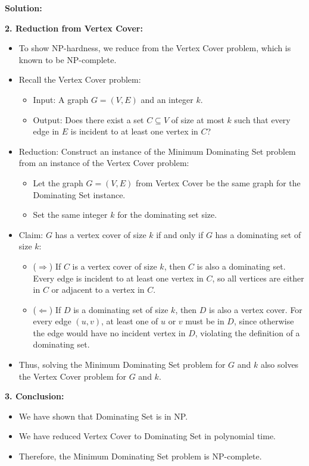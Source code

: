 \documentclass[11pt]{article}
\newenvironment{solution}{%
    \par\noindent\textbf{Solution:}\par%
}{\par}
\begin{document}
\begin{solution}
\textbf{2. Reduction from Vertex Cover:}
\begin{itemize}
    \item To show NP-hardness, we reduce from the Vertex Cover problem, which is known to be NP-complete.
    \item Recall the Vertex Cover problem:
    \begin{itemize}
        \item Input: A graph \( G = (V, E) \) and an integer \( k \).
        \item Output: Does there exist a set \( C \subseteq V \) of size at most \( k \) such that every edge in \( E \) is incident to at least one vertex in \( C \)?
    \end{itemize}
    \item Reduction: Construct an instance of the Minimum Dominating Set problem from an instance of the Vertex Cover problem:
    \begin{itemize}
        \item Let the graph \( G = (V, E) \) from Vertex Cover be the same graph for the Dominating Set instance.
        \item Set the same integer \( k \) for the dominating set size.
    \end{itemize}
    \item Claim: \( G \) has a vertex cover of size \( k \) if and only if \( G \) has a dominating set of size \( k \):
    \begin{itemize}
        \item (\( \Rightarrow \)) If \( C \) is a vertex cover of size \( k \), then \( C \) is also a dominating set. Every edge is incident to at least one vertex in \( C \), so all vertices are either in \( C \) or adjacent to a vertex in \( C \).
        \item (\( \Leftarrow \)) If \( D \) is a dominating set of size \( k \), then \( D \) is also a vertex cover. For every edge \( (u, v) \), at least one of \( u \) or \( v \) must be in \( D \), since otherwise the edge would have no incident vertex in \( D \), violating the definition of a dominating set.
    \end{itemize}
    \item Thus, solving the Minimum Dominating Set problem for \( G \) and \( k \) also solves the Vertex Cover problem for \( G \) and \( k \).
\end{itemize}

\textbf{3. Conclusion:}
\begin{itemize}
    \item We have shown that Dominating Set is in NP.
    \item We have reduced Vertex Cover to Dominating Set in polynomial time.
    \item Therefore, the Minimum Dominating Set problem is NP-complete.
\end{itemize}
\end{solution}
\end{document}
